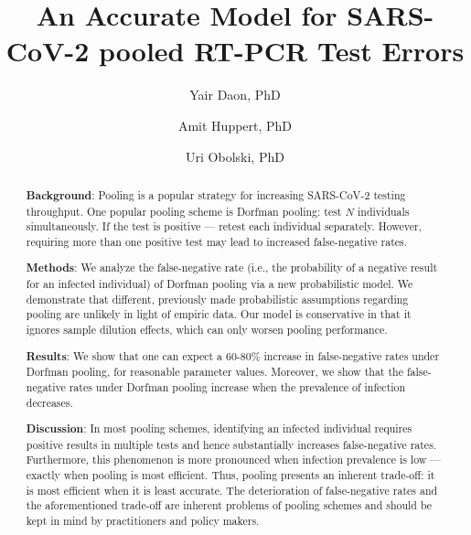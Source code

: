 \documentclass{article}
\begin{document}
\title{An Accurate Model for SARS-CoV-2 pooled RT-PCR Test Errors}

\author[1,2]{Yair Daon, PhD}
\author[2,3]{Amit Huppert, PhD}
\author[1,2]{Uri Obolski, PhD}



\date{}

\maketitle

\begin{abstract}
\textbf{Background}: Pooling is a popular strategy for increasing
SARS-CoV-2 testing throughput. One popular pooling scheme is Dorfman
pooling: test $N$ individuals simultaneously. If the test is positive
--- retest each individual separately. However, requiring more than
one positive test may lead to increased false-negative rates.

\textbf{Methods}: We analyze the false-negative rate (i.e., the
probability of a negative result for an infected individual) of
Dorfman pooling via a new probabilistic model. We demonstrate that
different, previously made probabilistic assumptions regarding pooling
are unlikely in light of empiric data. Our model is conservative in
that it ignores sample dilution effects, which can only worsen pooling
performance.

\textbf{Results}: We show that one can expect a 60-80\% increase in
false-negative rates under Dorfman pooling, for reasonable parameter
values. Moreover, we show that the false-negative rates under Dorfman
pooling increase when the prevalence of infection decreases.

\textbf{Discussion}: In most pooling schemes, identifying an infected
individual requires positive results in multiple tests and hence
substantially increases false-negative rates. Furthermore, this
phenomenon is more pronounced when infection prevalence is low ---
exactly when pooling is most efficient. Thus, pooling presents an
inherent trade-off: it is most efficient when it is least
accurate. The deterioration of false-negative rates and the
aforementioned trade-off are inherent problems of pooling schemes and
should be kept in mind by practitioners and policy makers.
\end{abstract}
\end{document}
